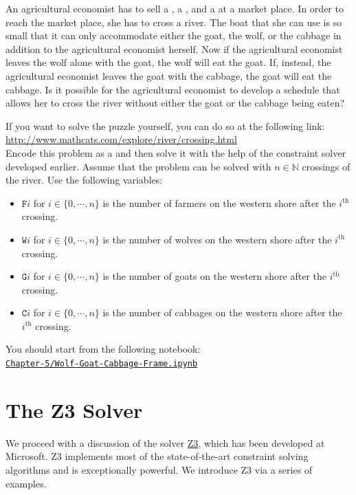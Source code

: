 \exerciseEng
An agricultural economist has to sell a , a , and a 
at a market place.  In order to reach the market place, she has to cross a river.  The
boat that she can use is so small that it can only accommodate either the goat, the wolf,
or the cabbage in addition to the agricultural economist herself.  Now if the agricultural
economist leaves the wolf alone with the goat, the wolf will eat the goat.  If, instead,
the agricultural economist leaves the goat with the cabbage, the goat will eat the
cabbage.  Is it possible for the agricultural economist to develop a schedule that allows
her to cross the river without either the goat or the cabbage being eaten?

If you want to solve the puzzle yourself, you can do so at the following link:
\\[0.2cm]
\hspace*{1.3cm}
\href{http://www.mathcats.com/explore/river/crossing.html}{http://www.mathcats.com/explore/river/crossing.html}
\\[0.2cm]
Encode this problem as a  and then solve it with the help
of the constraint solver developed earlier.  Assume that the
problem can be solved with $n\in\mathbb{N}$ crossings of the river.  Use the following
variables:
\begin{itemize}
\item $\texttt{F}i$ for $i\in\{0,\cdots,n\}$ is the number of farmers on the western shore after the 
      $i^{\textrm{th}}$ crossing.
\item $\texttt{W}i$ for $i\in\{0,\cdots,n\}$ is the number of wolves on the western shore after the 
      $i^{\textrm{th}}$ crossing.
\item $\texttt{G}i$ for $i\in\{0,\cdots,n\}$ is the number of goats on the western shore after the 
      $i^{\textrm{th}}$ crossing.
\item $\texttt{C}i$ for $i\in\{0,\cdots,n\}$ is the number of cabbages on the western shore after the 
      $i^{\textrm{th}}$ crossing.
\end{itemize}
You should start from the following notebook:
\\[0.2cm]
\hspace*{1.3cm}
\href{https://github.com/karlstroetmann/Logic/blob/master/Java/Chapter-5/Wolf-Goat-Cabbage-Frame.ipynb}{\texttt{Chapter-5/Wolf-Goat-Cabbage-Frame.ipynb}}
\eox

\section{The Z3 Solver}
We proceed with a discussion of the solver
\href{https://www.microsoft.com/en-us/research/project/z3-3/}{Z3}, which has been developed
at Microsoft.  Z3 implements most of the state-of-the-art constraint solving algorithms
and is exceptionally powerful.  We introduce Z3 via a series of examples.

